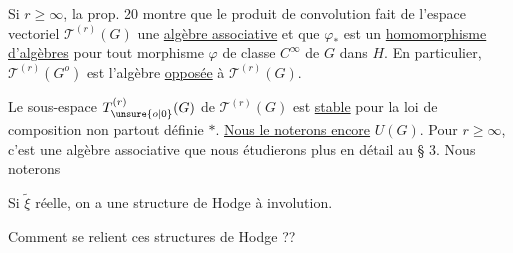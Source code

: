 Si $r\geq\infty$, la prop. 20 montre que le produit de convolution fait de l'espace vectoriel $\mathcal T^{(r)}(G)$ une \uline{algèbre associative} et que $\varphi_*$ est un \uline{homomorphisme d'algèbres} pour tout morphisme $\varphi$ de classe $C^\infty$ de $G$ dans $H$. En particulier, $\mathcal T^{(r)}(G^o)$ est l'algèbre \uline{opposée} à $\mathcal T^{(r)}(G)$.

Le sous-espace $T_{\unsure{o|0}}^{(r)}(G)$ de $\mathcal T^{(r)}(G)$ est \uline{stable} pour la loi de composition non partout définie $*$. \uline{Nous le noterons encore} $U(G)$. Pour $r\geq\infty$, c'est une algèbre associative que nous étudierons plus en détail au § 3. Nous noterons

Si $\widetilde\xi$  réelle, on a une structure de Hodge à involution.

Comment se relient ces structures de Hodge ??



\par\noindent
{}
\par

